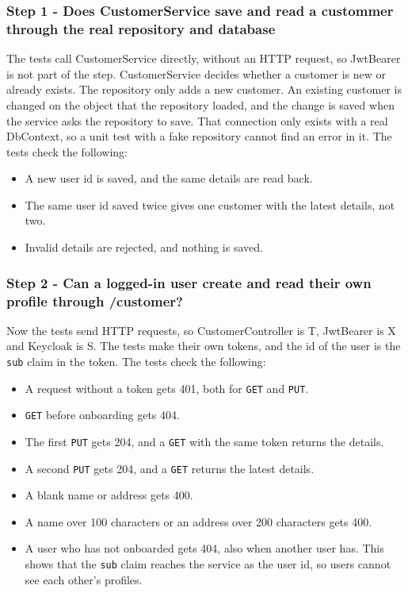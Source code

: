 \documentclass[a4paper,11pt]{article}
\begin{document}
\subsubsection*{Step 1 - Does CustomerService save and read a custommer through the real repository and database}
The tests call CustomerService directly, without an HTTP request, so JwtBearer is not part of the step. CustomerService decides whether a customer is new or already exists. The repository only adds a new customer. An existing customer is changed on the object that the repository loaded, and the change is saved when the service asks the repository to save. That connection only exists with a real DbContext, so a unit test with a fake repository cannot find an error in it. The tests check the following:
\begin{itemize}
  \item A new user id is saved, and the same details are read back.
  \item The same user id saved twice gives one customer with the latest details, not two.
  \item Invalid details are rejected, and nothing is saved.
\end{itemize}

\subsubsection*{Step 2 - Can a logged-in user create and read their own profile through /customer?}
Now the tests send HTTP requests, so CustomerController is T, JwtBearer is X and Keycloak is S. The tests make their own tokens, and the id of the user is the \texttt{sub} claim in the token. The tests check the following:
\begin{itemize}
  \item A request without a token gets 401, both for \texttt{GET} and \texttt{PUT}.
  \item \texttt{GET} before onboarding gets 404.
  \item The first \texttt{PUT} gets 204, and a \texttt{GET} with the same token returns the details.
  \item A second \texttt{PUT} gets 204, and a \texttt{GET} returns the latest details.
  \item A blank name or address gets 400.
  \item A name over 100 characters or an address over 200 characters gets 400.
  \item A user who has not onboarded gets 404, also when another user has. This shows that the \texttt{sub} claim reaches the service as the user id, so users cannot see each other's profiles.
\end{itemize}
\end{document}
